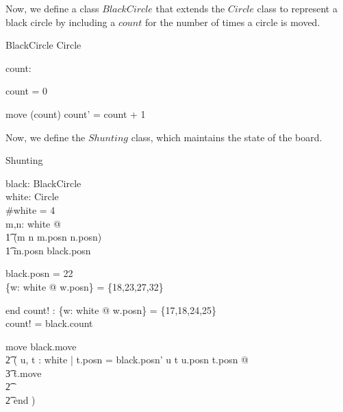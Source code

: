 \documentclass{article}
\begin{document}
Now, we define a class $BlackCircle$ that extends the $Circle$ class to
represent a black circle by including a $count$ for the number of times a
circle is moved.

\begin{class}{BlackCircle}
\also
\inherits Circle\\
\begin{state}
  count: \nat
\end{state} \classbreak
\begin{init}
  count = 0
\end{init} \classbreak
\begin{op}{move}
  \Delta(count)
\where
  count' = count + 1
\end{op}
\end{class}

Now, we define the $Shunting$ class, which maintains the state of the
board.

\begin{class}{Shunting}
\also
\begin{state}
  black: BlackCircle \\
  white: \power Circle \\
\where
  \#white = 4 \\
  \forall m,n: white @ \\
      \t1 (m \neq n \iff m.posn \neq n.posn) \land \\
      \t1 m.posn \neq black.posn
\end{state} \classbreak
\begin{init}
  black.posn = 22 \\
  \{w: white @ w.posn\} = \{18,23,27,32\} \\ 
\end{init} \classbreak
\begin{op}{end}
  count! : \nat
\where
  \{w: white @ w.posn\} = \{17,18,24,25\} \\
  count! = black.count
\end{op}  \classbreak
move \sdef black.move \land\\
         \t2 ( \dgch u, t : white | t.posn = black.posn' \land
                u \neq t \land u.posn \neq t.posn @\\
		\t3 t.move\\
		\t2 \gch \\
		\t2 end )
\end{class}
\end{document}
